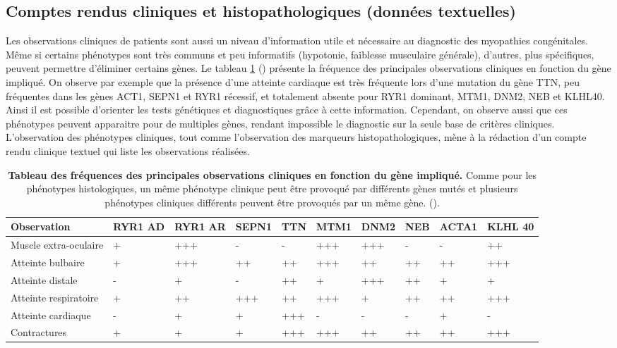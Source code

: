 \subsection{Comptes rendus cliniques et histopathologiques (données textuelles) }
Les observations cliniques de patients sont aussi un niveau d'information utile et nécessaire au diagnostic des myopathies congénitales. Même si certains phénotypes sont très communs et peu informatifs (hypotonie, faiblesse musculaire générale), d'autres, plus spécifiques, peuvent permettre d'éliminer certains gènes. Le tableau \ref{tab:clinic} (\cite{jungbluth_congenital_2018}) présente la fréquence des principales observations cliniques en fonction du gène impliqué. On observe par exemple que la présence d'une atteinte cardiaque est très fréquente lors d'une mutation du gène TTN, peu fréquentes dans les gènes ACT1, SEPN1 et RYR1 récessif, et totalement absente pour RYR1 dominant, MTM1, DNM2, NEB et KLHL40. Ainsi il est possible d'orienter les tests génétiques et diagnostiques grâce à cette information. Cependant, on observe aussi que ces phénotypes peuvent apparaitre pour de multiples gènes, rendant impossible le diagnostic sur la seule base de critères cliniques. L'observation des phénotypes cliniques, tout comme l'observation des marqueurs histopathologiques, mène à la rédaction d'un compte rendu clinique textuel qui liste les observations réalisées.

\begin{table}[!ht]
\begin{tabularx}{\textwidth}{|p{1.8cm}|X|X|X|X|X|X|X|X|X|}
 \hline
\textbf{Observation} & \textbf{RYR1 AD} & \textbf{RYR1 AR} & \textbf{SEPN1} & \textbf{TTN} & \textbf{MTM1} & \textbf{DNM2} & \textbf{NEB} & \textbf{ACTA1} & \textbf{KLHL 40} \\
\hline
Muscle extra-oculaire & + & +++ & - & - & +++ & +++ & - & - & ++ \\
\hline
Atteinte bulbaire & + & +++ & ++ & ++ & +++ & ++ & ++ & ++ & +++ \\
\hline
Atteinte distale & - & + & - & ++ & + & +++ & ++ & + & + \\
\hline
Atteinte respiratoire & + & ++ & +++ & ++ & +++ & + & ++ & ++ & +++ \\
\hline
Atteinte cardiaque & - & + & + & +++ & - & - & - & + & - \\
\hline
Contractures & + & + & + & +++ & +++ & ++ & ++ & ++ & +++ \\
\hline
\end{tabularx}
\caption[Tableau des fréquences des principales observations cliniques en fonction du gène impliqué]{\textbf{Tableau des fréquences des principales observations cliniques en fonction du gène impliqué.} Comme pour les phénotypes histologiques, un même phénotype clinique peut être provoqué par différents gènes mutés et plusieurs phénotypes cliniques différents peuvent être provoqués par un même gène.  (\cite{jungbluth_congenital_2018}).}
\label{tab:clinic}
\end{table}

